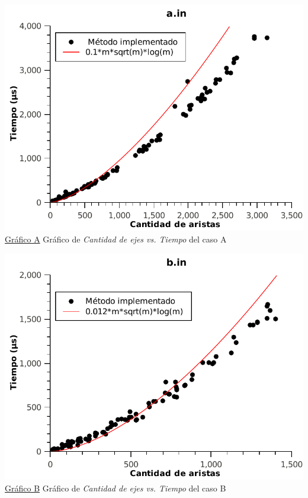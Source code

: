 \begin{center}
\vspace*{1.5cm}
\label{graficoA}
\hspace*{-2.1cm}\includegraphics[scale = 0.9]{../ej2/pruebas_graficos/GraphA.pdf} \\
\underline{Gráfico A} Gráfico de \textit{Cantidad de ejes vs. Tiempo} del caso A

\vspace*{1.5cm}
\label{graficoB}
\hspace*{-2.1cm}\includegraphics[scale = 0.9]{../ej2/pruebas_graficos/GraphB.pdf} \\
\underline{Gráfico B} Gráfico de \textit{Cantidad de ejes vs. Tiempo} del caso B


\end{center}
